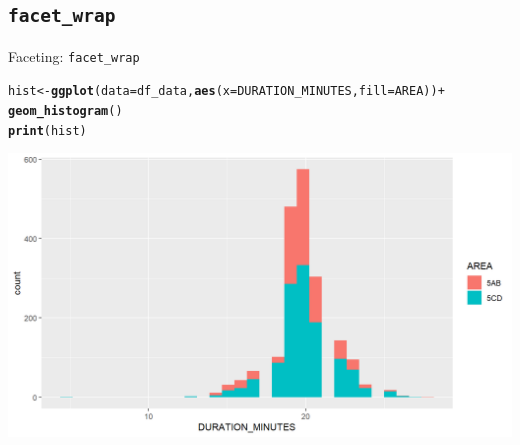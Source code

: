 \documentclass{beamer}\usepackage[]{graphicx}\usepackage[]{color}
\makeatletter
\newcommand{\hlopt}[1]{\textcolor[rgb]{0,0,0}{#1}}%
\newcommand{\hlstd}[1]{\textcolor[rgb]{0.345,0.345,0.345}{#1}}%
\newcommand{\hlkwb}[1]{\textcolor[rgb]{0.69,0.353,0.396}{#1}}%
\newcommand{\hlkwc}[1]{\textcolor[rgb]{0.333,0.667,0.333}{#1}}%
\newcommand{\hlkwd}[1]{\textcolor[rgb]{0.737,0.353,0.396}{\textbf{#1}}}%
\newenvironment{kframe}{%
 \def\at@end@of@kframe{}%
 \ifinner\ifhmode%
  \def\at@end@of@kframe{\end{minipage}}%
  \begin{minipage}{\columnwidth}%
 \fi\fi%
 \def\FrameCommand##1{\hskip\@totalleftmargin \hskip-\fboxsep
 \colorbox{shadecolor}{##1}\hskip-\fboxsep
     \hskip-\linewidth \hskip-\@totalleftmargin \hskip\columnwidth}%
 \MakeFramed {\advance\hsize-\width
   \@totalleftmargin\z@ \linewidth\hsize
   \@setminipage}}%
 {\par\unskip\endMakeFramed%
 \at@end@of@kframe}
\newenvironment{knitrout}{}{} %
\makeatother
\begin{document}
\subsection{\lstinline{facet_wrap}}
\begin{frame}[fragile]{Faceting: \lstinline{facet_wrap}}
\begin{knitrout}\footnotesize
{}\color{fgcolor}\begin{kframe}
\begin{alltt}
\hlstd{hist} \hlkwb{<-} \hlkwd{ggplot}\hlstd{(}\hlkwc{data}\hlstd{=df_data,} \hlkwd{aes}\hlstd{(}\hlkwc{x}\hlstd{=DURATION_MINUTES,} \hlkwc{fill}\hlstd{=AREA))} \hlopt{+}
  \hlkwd{geom_histogram}\hlstd{()}
\hlkwd{print}\hlstd{(hist)}
\end{alltt}


{\ttfamily\noindent\itshape\color{messagecolor}{\#\# `stat\_bin()` using `bins = 30`. Pick better value with `binwidth`.}}\end{kframe}

{\centering \includegraphics[width=.9\linewidth]{figure/facet_wrap_0-1} 

}



\end{knitrout}
\end{frame}
\end{document}

